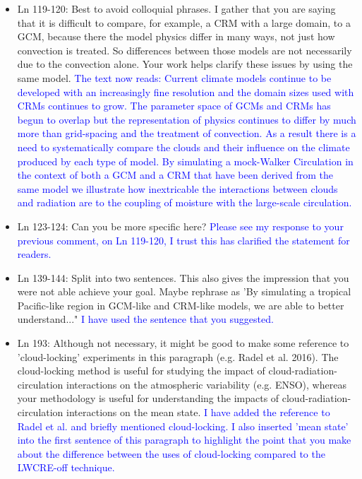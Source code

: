\documentclass[draft]{agujournal2019}
\begin{document}
\begin{itemize}
  \item Ln 119-120: Best to avoid colloquial phrases. I gather that you are saying that it is difficult to compare, for example, a CRM with a large domain, to a GCM, because there the model physics differ in many ways, not just how convection is treated. So differences between those models are not necessarily due to the convection alone. Your work helps clarify these issues by using the same model.
  \textcolor{blue}{The text now reads: Current climate models continue to be developed with an increasingly fine resolution and 
the domain sizes used with CRMs continues to grow.  The parameter space of GCMs and CRMs has begun to overlap but the representation of 
physics continues to differ by much more than grid-spacing and the treatment of convection.  As a result there is a need to systematically compare the 
clouds and their influence on the climate produced by each type of model.
By simulating a mock-Walker Circulation in the context of both a GCM and a CRM that have been derived from the same model we 
illustrate how inextricable the interactions between clouds and radiation are to the coupling of moisture with the large-scale circulation.}
  
  \item Ln 123-124: Can you be more specific here?
  \textcolor{blue}{Please see my response to your previous comment, on Ln 119-120, I trust this has clarified the statement for readers.}
  
  \item Ln 139-144: Split into two sentences. This also gives the impression that you were not able achieve your goal. Maybe rephrase as 'By simulating a tropical Pacific-like region in GCM-like and CRM-like models, we are able to better understand..."
  \textcolor{blue}{I have used the sentence that you suggested.}
  
  \item Ln 193: Although not necessary, it might be good to make some reference to 'cloud-locking' experiments in this paragraph (e.g. Radel et al. 2016).  The cloud-locking method is useful for studying the impact of cloud-radiation-circulation interactions on the atmospheric variability (e.g. ENSO), whereas your methodology is useful for understanding the impacts of cloud-radiation-circulation interactions on the mean state. 
  \textcolor{blue}{I have added the reference to Radel et al. and briefly mentioned cloud-locking.  I also inserted 'mean state' into the first sentence of this paragraph to highlight the point that you make about the difference between the uses of cloud-locking compared to the LWCRE-off technique.}
  

\end{itemize}
\end{document}

